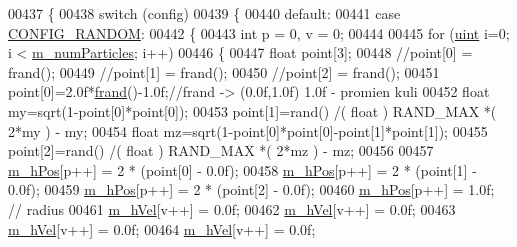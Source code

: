 \begin{DoxyCode}
00437 \{
00438     \textcolor{keywordflow}{switch} (config)
00439     \{
00440         \textcolor{keywordflow}{default}:
00441         \textcolor{keywordflow}{case} \hyperlink{class_particle_system_a1dca3996c8068602412ef9f7826605d1a053c69e4e6b094605ea152a644e7c9ee}{CONFIG\_RANDOM}:
00442             \{
00443                 \textcolor{keywordtype}{int} p = 0, v = 0;
00444 
00445                 \textcolor{keywordflow}{for} (\hyperlink{particles__kernel_8cuh_a91ad9478d81a7aaf2593e8d9c3d06a14}{uint} i=0; i < \hyperlink{class_particle_system_a23d238efa80a647d4b6cde034f486a91}{m\_numParticles}; i++)
00446                 \{
00447                     \textcolor{keywordtype}{float} point[3];
00448                     \textcolor{comment}{//point[0] = frand();}
00449                     \textcolor{comment}{//point[1] = frand();}
00450                     \textcolor{comment}{//point[2] = frand();}
00451                                         point[0]=2.0f*\hyperlink{particle_system_8cpp_a5459f6b6b39f9a6b80de7f17c3777ee2}{frand}()-1.0f;\textcolor{comment}{//frand -> (0.0f,1.0f) 1.0f -
       promien kuli}
00452                                         \textcolor{keywordtype}{float} my=sqrt(1-point[0]*point[0]);
00453                                         point[1]=rand() /( float ) RAND\_MAX *( 2*my ) - my;
00454                                         \textcolor{keywordtype}{float} mz=sqrt(1-point[0]*point[0]-point[1]*point[1]);
00455                                         point[2]=rand() /( float ) RAND\_MAX *( 2*mz ) - mz;
00456 
00457                     \hyperlink{class_particle_system_ab9d75471d2eaaeb8fa98d2f3f47d9c25}{m\_hPos}[p++] = 2 * (point[0] - 0.0f);
00458                     \hyperlink{class_particle_system_ab9d75471d2eaaeb8fa98d2f3f47d9c25}{m\_hPos}[p++] = 2 * (point[1] - 0.0f);
00459                     \hyperlink{class_particle_system_ab9d75471d2eaaeb8fa98d2f3f47d9c25}{m\_hPos}[p++] = 2 * (point[2] - 0.0f);
00460                     \hyperlink{class_particle_system_ab9d75471d2eaaeb8fa98d2f3f47d9c25}{m\_hPos}[p++] = 1.0f; \textcolor{comment}{// radius}
00461                     \hyperlink{class_particle_system_a20560c896ee8a8bbc827a8e5902da7e2}{m\_hVel}[v++] = 0.0f;
00462                     \hyperlink{class_particle_system_a20560c896ee8a8bbc827a8e5902da7e2}{m\_hVel}[v++] = 0.0f;
00463                     \hyperlink{class_particle_system_a20560c896ee8a8bbc827a8e5902da7e2}{m\_hVel}[v++] = 0.0f;
00464                     \hyperlink{class_particle_system_a20560c896ee8a8bbc827a8e5902da7e2}{m\_hVel}[v++] = 0.0f;

\end{DoxyCode}
